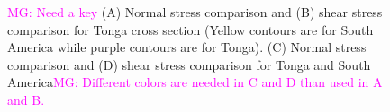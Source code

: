 \documentclass[12pt]{article}
\newcommand{\mgnote}[1]{\textcolor{magenta}{MG: #1}}
\begin{document}
{\begin{figure}[H]
\centering
\hspace{-0.2cm}
\hspace{-0.2cm}
\hspace{-0.2cm}
\hspace{-0.2cm}
\caption{
\mgnote{Need a key}
(A) Normal stress comparison and 
(B) shear stress comparison for Tonga cross section (Yellow contours are for South America while purple contours are for Tonga). 
(C) Normal stress comparison and (D) shear stress comparison for Tonga and South America\mgnote{Different colors are needed in C and D than used in A and B.}}
\label{fig:shear_smaller}
\end{figure}


}
\end{document}

